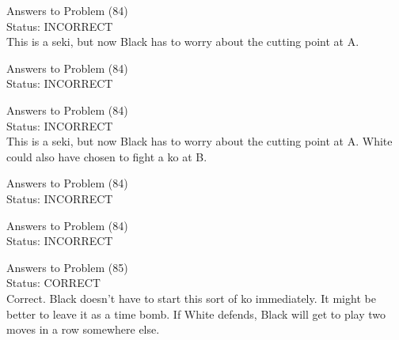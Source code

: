 \documentclass[11pt]{article}
\begin{document}
\begin{minipage}[t]{0.5\textwidth}
  {\centering
  
  Answers to Problem (84)\\
  Status: INCORRECT\\
  This is a seki, but now Black has to worry about the cutting point at A.\\
  }
\end{minipage}
\begin{minipage}[t]{0.5\textwidth}
  {\centering
  
  Answers to Problem (84)\\
  Status: INCORRECT\\
  
  }
\end{minipage}
\begin{minipage}[t]{0.5\textwidth}
  {\centering
  
  Answers to Problem (84)\\
  Status: INCORRECT\\
  This is a seki, but now Black has to worry about the cutting point at A. White could also have chosen to fight a ko at B.\\
  }
\end{minipage}
\begin{minipage}[t]{0.5\textwidth}
  {\centering
  
  Answers to Problem (84)\\
  Status: INCORRECT\\
  
  }
\end{minipage}
\begin{minipage}[t]{0.5\textwidth}
  {\centering
  
  Answers to Problem (84)\\
  Status: INCORRECT\\
  
  }
\end{minipage}
\begin{minipage}[t]{0.5\textwidth}
  {\centering
  
  Answers to Problem (85)\\
  Status: CORRECT\\
  Correct. Black doesn't have to start this sort of ko immediately. It might be better to leave it as a time bomb. If White defends, Black will get to play two moves in a row somewhere else.\\
  }
\end{minipage}
\end{document}
